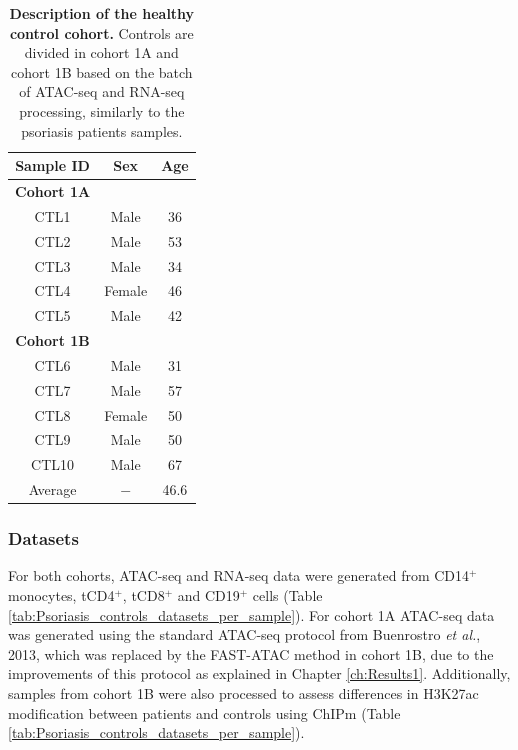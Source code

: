 \begin{table}[htbp]
\centering
\begin{tabular}{@{} c c c}
\toprule
\textbf{Sample ID} & \textbf{Sex} & \textbf{Age} \\
\midrule
\midrule
\textbf{Cohort 1A} & & \\
\midrule
CTL1 & Male   & 36 \\
CTL2 & Male   & 53 \\
CTL3 & Male   & 34 \\
CTL4 & Female & 46 \\
CTL5 & Male   & 42 \\
\midrule
\midrule
\textbf{Cohort 1B} & & \\
\midrule
CTL6  & Male   & 31 \\
CTL7  & Male   & 57 \\
CTL8  & Female & 50 \\
CTL9  & Male   & 50 \\
CTL10 & Male   & 67 \\
\midrule
Average & $-$ & 46.6 \\ 
\bottomrule
\end{tabular}
\medskip %
\caption[Description of the healthy control cohort.]{\textbf{Description of the healthy control cohort.} Controls are divided in cohort 1A and cohort 1B based on the batch of ATAC-seq and RNA-seq processing, similarly to the psoriasis patients samples.}
\label{tab:Control_cohort_metadata}
\end{table}
\bigskip %


\subsubsection{Datasets}

For both cohorts, ATAC-seq and RNA-seq data were generated from CD14$^+$ monocytes, tCD4$^+$, tCD8$^+$ and CD19$^+$ cells (Table \ref{tab:Psoriasis_controls_datasets_per_sample}). For cohort 1A ATAC-seq data was generated using the standard ATAC-seq protocol from Buenrostro \textit{et al.}, 2013, which was replaced by the FAST-ATAC method \parencite{Corces2016} in cohort 1B, due to the improvements of this protocol as explained in Chapter \ref{ch:Results1}. Additionally, samples from cohort 1B were also processed to assess differences in H3K27ac modification between patients and controls using ChIPm (Table \ref{tab:Psoriasis_controls_datasets_per_sample}). 

